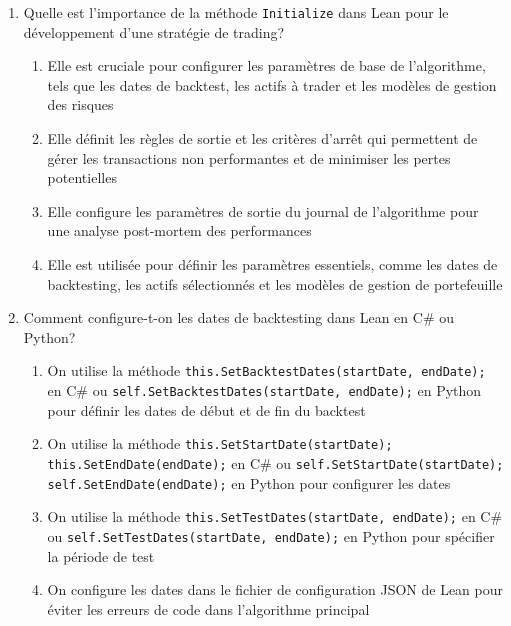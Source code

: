 \documentclass[a4paper,12pt]{article}
\begin{document}
\begin{enumerate}
    \item Quelle est l'importance de la méthode \texttt{Initialize} dans Lean pour le développement d'une stratégie de trading?
    \begin{enumerate}[label=(\Alph*)]
        \item Elle est cruciale pour configurer les paramètres de base de l'algorithme, tels que les dates de backtest, les actifs à trader et les modèles de gestion des risques
        \item Elle définit les règles de sortie et les critères d'arrêt qui permettent de gérer les transactions non performantes et de minimiser les pertes potentielles
        \item Elle configure les paramètres de sortie du journal de l'algorithme pour une analyse post-mortem des performances
        \item Elle est utilisée pour définir les paramètres essentiels, comme les dates de backtesting, les actifs sélectionnés et les modèles de gestion de portefeuille
    \end{enumerate}

    \item Comment configure-t-on les dates de backtesting dans Lean en C\# ou Python?
    \begin{enumerate}[label=(\Alph*)]
        \item On utilise la méthode \texttt{this.SetBacktestDates(startDate, endDate);} en C\# ou \texttt{self.SetBacktestDates(startDate, endDate);} en Python pour définir les dates de début et de fin du backtest
        \item On utilise la méthode \texttt{this.SetStartDate(startDate); this.SetEndDate(endDate);} en C\# ou \texttt{self.SetStartDate(startDate); self.SetEndDate(endDate);} en Python pour configurer les dates
        \item On utilise la méthode \texttt{this.SetTestDates(startDate, endDate);} en C\# ou \texttt{self.SetTestDates(startDate, endDate);} en Python pour spécifier la période de test
        \item On configure les dates dans le fichier de configuration JSON de Lean pour éviter les erreurs de code dans l'algorithme principal
    \end{enumerate}


\end{enumerate}
\end{document}
